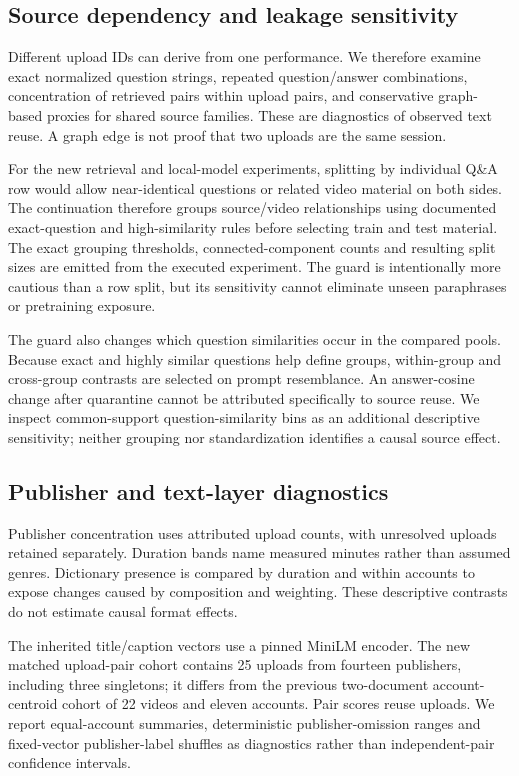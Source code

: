 \subsection{Source dependency and leakage sensitivity}
Different upload IDs can derive from one performance. We therefore examine exact normalized question strings, repeated question/answer combinations, concentration of retrieved pairs within upload pairs, and conservative graph-based proxies for shared source families. These are diagnostics of observed text reuse. A graph edge is not proof that two uploads are the same session.

For the new retrieval and local-model experiments, splitting by individual Q\&A row would allow near-identical questions or related video material on both sides. The continuation therefore groups source/video relationships using documented exact-question and high-similarity rules before selecting train and test material. The exact grouping thresholds, connected-component counts and resulting split sizes are emitted from the executed experiment. The guard is intentionally more cautious than a row split, but its sensitivity cannot eliminate unseen paraphrases or pretraining exposure.

The guard also changes which question similarities occur in the compared pools. Because exact and highly similar questions help define groups, within-group and cross-group contrasts are selected on prompt resemblance. An answer-cosine change after quarantine cannot be attributed specifically to source reuse. We inspect common-support question-similarity bins as an additional descriptive sensitivity; neither grouping nor standardization identifies a causal source effect.

\subsection{Publisher and text-layer diagnostics}
Publisher concentration uses attributed upload counts, with unresolved uploads retained separately. Duration bands name measured minutes rather than assumed genres. Dictionary presence is compared by duration and within accounts to expose changes caused by composition and weighting. These descriptive contrasts do not estimate causal format effects.

The inherited title/caption vectors use a pinned MiniLM encoder. The new matched upload-pair cohort contains 25 uploads from fourteen publishers, including three singletons; it differs from the previous two-document account-centroid cohort of 22 videos and eleven accounts. Pair scores reuse uploads. We report equal-account summaries, deterministic publisher-omission ranges and fixed-vector publisher-label shuffles as diagnostics rather than independent-pair confidence intervals.

